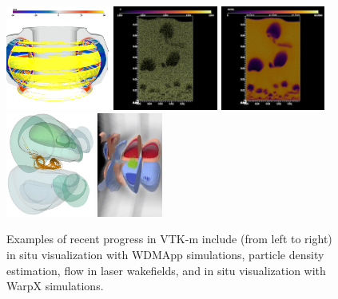 \begin{figure}[t]
  \centering

  \includegraphics[height=1.35in]{projects/2.3.4-DataViz/2.3.4.13-ECP-VTK-m/VTKm-wdm-in-situ.png}\quad
  \includegraphics[height=1.35in]{projects/2.3.4-DataViz/2.3.4.13-ECP-VTK-m/VTKm-particle-spheres.png}%
  \includegraphics[height=1.35in]{projects/2.3.4-DataViz/2.3.4.13-ECP-VTK-m/VTKm-particle-density.png}\quad
  \includegraphics[height=1.35in]{projects/2.3.4-DataViz/2.3.4.13-ECP-VTK-m/VTKm-warpx-flow.png}\quad
  \includegraphics[height=1.35in]{projects/2.3.4-DataViz/2.3.4.13-ECP-VTK-m/VTKm-warpx-in-situ.png}\quad
  \caption{
    Examples of recent progress in VTK-m include (from left to right) in situ visualization with WDMApp simulations, particle density estimation, flow in laser wakefields, and in situ visualization with WarpX simulations.
  }
  \label{fig:VTKmRecent}
\end{figure}

